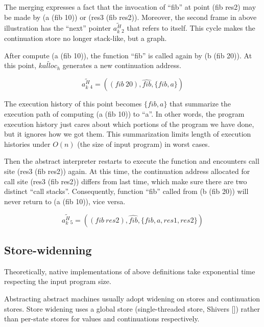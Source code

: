 \documentclass{article}
\begin{document}
The merging expresses a fact that the invocation of ``fib'' at point (fib res2) may be made by (a (fib 10)) or (res3 (fib res2)). Moreover, the second frame in above illustration has the ``next'' pointer $\widetilde{a^H_k{}_2}$ that refers to itself. This cycle makes the continuation store no longer stack-like, but a graph.

After compute (a (fib 10)), the function ``fib'' is called again by (b (fib 20)). At this point, $\widetilde{kalloc_h}$ generates a new continuation address.

\[
\widetilde{a^H_k{}_4} = ((fib\ 20), \widehat{fib}, \{fib, a\})
\]

The execution history of this point becomes $\{fib, a\}$ that summarize the execution path of computing (a (fib 10)) to ``a''. In other words, the program execution history just cares about which portions of the program we have done, but it ignores how we got them. This summarization limits length of execution histories under $O(\textit{n})$ (the size of input program) in worst cases.

Then the abstract interpreter restarts to execute the function and encounters call site (res3 (fib res2)) again. At this time, the continuation address allocated for call site (res3 (fib res2)) differs from last time, which make sure there are two distinct ``call stacks''. Consequently, function ``fib'' called from (b (fib 20)) will never return to (a (fib 10)), vice versa.

\[
\widetilde{a^H_k{}_5} = ((fib\ res2), \widehat{fib}, \{fib, a, res1, res2\})
\]

\subsection{Store-widenning}
\label{sub:Store-widenning}
Theoretically, native implementations of above definitions take exponential time respecting the input program size.

Abstracting abstract machines usually adopt widening on stores and continuation stores. Store widening uses a global store (single-threaded store, Shivers []) rather than per-state stores for values and continuations respectively.
\end{document}
